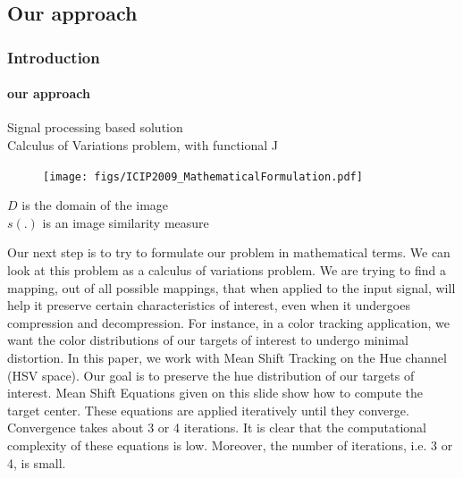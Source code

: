 \subsection{Our approach}
\begin{frame}
\frametitle{Introduction}
\framesubtitle{our approach} 
\logoCSIPCPL\mypagenum
{}
{
	{\color{red}Signal processing based solution} \\ 
	Calculus of Variations problem, with functional J
	\begin{figure}
		\texttt{[image: figs/ICIP2009\_MathematicalFormulation.pdf]}
	\end{figure}
	$D$ is the domain of the image\\
	$s(.)$ is an image similarity measure
}
{
Our next step is to try to formulate our problem in mathematical terms.  We can look at this problem as a calculus of variations problem.  We are trying to find a mapping, out of all possible mappings, that when applied to the input signal, will help it preserve certain characteristics of interest, even when it undergoes compression and decompression.  For instance, in a color tracking application, we want the color distributions of our targets of interest to undergo minimal distortion.  In this paper, we work with Mean Shift Tracking on the Hue channel (HSV space).  Our goal is to preserve the hue distribution of our targets of interest.
\newline
\newline
Mean Shift Equations given on this slide show how to compute the target center.  These equations are applied iteratively until they converge.  Convergence takes about 3 or 4 iterations.  It is clear that the computational complexity of these equations is low.  Moreover, the number of iterations, i.e. 3 or 4, is small.
}
\end{frame}






